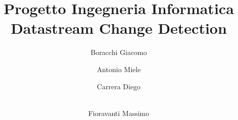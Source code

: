 \documentclass[a4paper]{article}
\begin{document}
	
	\author{Boracchi Giacomo \and Antonio Miele \and Carrera Diego\and \\ Fioravanti Massimo}
	\title{Progetto Ingegneria Informatica \\ Datastream Change Detection}
	\maketitle
	\tableofcontents
	\clearpage
	
	
	
	
	
	
	
\end{document}
